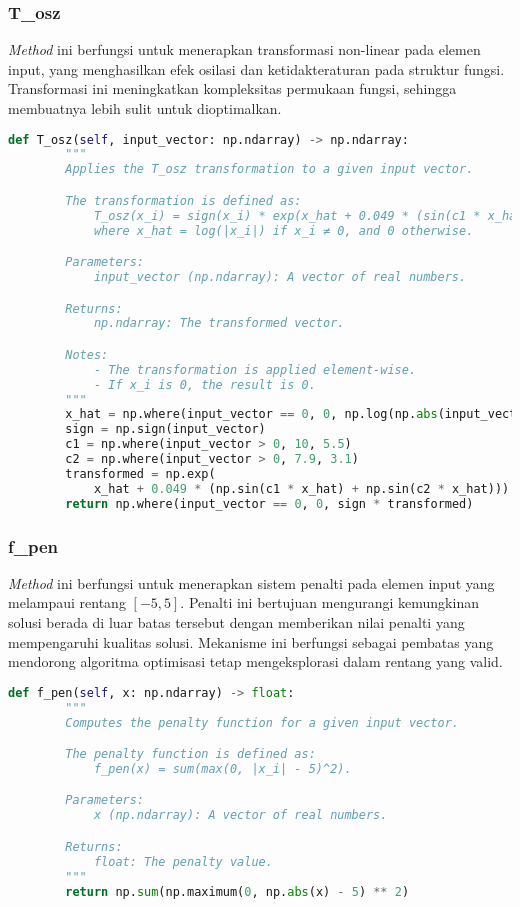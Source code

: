 \subsubsection{T\_osz}
\textit{Method} ini berfungsi untuk menerapkan transformasi non-linear pada elemen input, yang menghasilkan efek osilasi dan ketidakteraturan pada struktur fungsi. Transformasi ini meningkatkan kompleksitas permukaan fungsi, sehingga membuatnya lebih sulit untuk dioptimalkan.
\begin{lstlisting}[language=Python, caption=\textit{method} untuk menerapkan transformasi non-linear pada elemen input, label=lst:init_cec]
    def T_osz(self, input_vector: np.ndarray) -> np.ndarray:
        """
        Applies the T_osz transformation to a given input vector.

        The transformation is defined as:
            T_osz(x_i) = sign(x_i) * exp(x_hat + 0.049 * (sin(c1 * x_hat) + sin(c2 * x_hat))),
            where x_hat = log(|x_i|) if x_i ≠ 0, and 0 otherwise.

        Parameters:
            input_vector (np.ndarray): A vector of real numbers.

        Returns:
            np.ndarray: The transformed vector.

        Notes:
            - The transformation is applied element-wise.
            - If x_i is 0, the result is 0.
        """
        x_hat = np.where(input_vector == 0, 0, np.log(np.abs(input_vector)))
        sign = np.sign(input_vector)
        c1 = np.where(input_vector > 0, 10, 5.5)
        c2 = np.where(input_vector > 0, 7.9, 3.1)
        transformed = np.exp(
            x_hat + 0.049 * (np.sin(c1 * x_hat) + np.sin(c2 * x_hat)))
        return np.where(input_vector == 0, 0, sign * transformed)
\end{lstlisting}
\subsubsection{f\_pen}
\textit{Method} ini berfungsi untuk menerapkan sistem penalti pada elemen input yang melampaui rentang $[-5,5]$. Penalti ini bertujuan mengurangi kemungkinan solusi berada di luar batas tersebut dengan memberikan nilai penalti yang mempengaruhi kualitas solusi. Mekanisme ini berfungsi sebagai pembatas yang mendorong algoritma optimisasi tetap mengeksplorasi dalam rentang yang valid.
\begin{lstlisting}[language=Python, caption=\textit{method} untuk menerapkan penalti pada elemen input, label=lst:init_cec]
    def f_pen(self, x: np.ndarray) -> float:
        """
        Computes the penalty function for a given input vector.

        The penalty function is defined as:
            f_pen(x) = sum(max(0, |x_i| - 5)^2).

        Parameters:
            x (np.ndarray): A vector of real numbers.

        Returns:
            float: The penalty value.
        """
        return np.sum(np.maximum(0, np.abs(x) - 5) ** 2)
\end{lstlisting}
